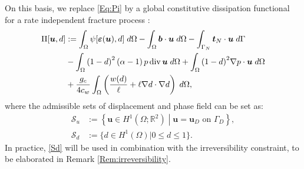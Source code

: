 On this basis, we replace \eqref{Eq:Pi} by a global constitutive dissipation functional for a rate independent fracture process \cite{BourdinCFRAC13}:
\begin{equation}\label{Eq:Dissipative_functional}
    \begin{aligned}
        \Pi[\bm{u},d] &:= \int_{\Omega} \psi[\bm{\varepsilon}(\bm{u}),d] \; d\Omega
	    - \int_{\Omega} \bm{b} \cdot \bm{u} \; d\Omega
	    - \int_{\Gamma_N} \bm{t}_N\cdot \bm{u} \; d\Gamma \\
	    &- \int_{\Omega}{\left(1 - d\right)}^2\left(\alpha - 1\right)p\operatorname{div}\bm{u}\; d\Omega + 
	    \int_{\Omega}{\left(1 - d\right)}^2\nabla p\cdot \bm{u}\; d\Omega \\
	    &+ \frac{g_c}{4c_{w}}\int_\Omega \left(\frac{w(d)}{\ell} + \ell \nabla d\cdot\nabla d\right)\;d\Omega,\\
    \end{aligned}
\end{equation}
where the admissible sets of displacement and phase field can be set as:
\begin{subequations}
\begin{align}
        \mathscr{S}_u &:= \left\{\bm{u} \in H^1\left(\Omega; \mathbb{R}^2\right) \middle|
        \bm{u} = \bm{u}_D \text{ on } \Gamma_D\right\}, \label{Su}\\
        \mathscr{S}_d &:= \{d\in H^1(\Omega)|0\le d\le 1\}.\label{Sd}
\end{align}
\end{subequations}
In practice, \eqref{Sd} will be used in combination with the irreversibility constraint, to be elaborated in Remark \ref{Rem:irreversibility}.

